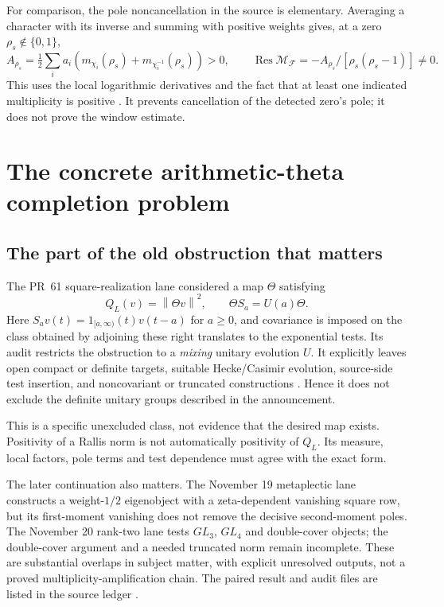 \documentclass[11pt,letterpaper]{article}
\theoremstyle{definition}
\theoremstyle{remark}
\newcommand{\Res}{\operatorname*{Res}}
\newcommand{\norm}[1]{\left\lVert#1\right\rVert}
\numberwithin{equation}{section}
\begin{document}
For comparison, the pole noncancellation in the source is elementary. Averaging a character with its inverse and summing with positive weights gives, at a zero $\rho_s\notin\{0,1\}$,
\[
 A_{\rho_s}=\tfrac12\sum_i a_i
 (m_{\chi_i}(\rho_s)+m_{\chi_i^{-1}}(\rho_s))>0,
 \qquad \Res\mathcal M_{\mathcal F}
 =-A_{\rho_s}/[\rho_s(\rho_s-1)]\ne0.
\]
This uses the local logarithmic derivatives and the fact that at least one indicated multiplicity is positive \cite{externalpoles}. It prevents cancellation of the detected zero's pole; it does not prove the window estimate.

\section{The concrete arithmetic-theta completion problem}

\subsection{The part of the old obstruction that matters}
The PR~61 square-realization lane considered a map $\Theta$ satisfying
\[
 Q_L(v)=\norm{\Theta v}^2,\qquad \Theta S_a=U(a)\Theta.
\]
Here $S_av(t)=1_{[a,\infty)}(t)v(t-a)$ for $a\ge0$, and covariance is imposed on the class obtained by adjoining these right translates to the exponential tests. Its audit restricts the obstruction to a \emph{mixing} unitary evolution $U$. It explicitly leaves open compact or definite targets, suitable Hecke/Casimir evolution, source-side test insertion, and noncovariant or truncated constructions \cite{rallisaudit}. Hence it does not exclude the definite unitary groups described in the announcement.

This is a specific unexcluded class, not evidence that the desired map exists. Positivity of a Rallis norm is not automatically positivity of $Q_L$. Its measure, local factors, pole terms and test dependence must agree with the exact form.

The later continuation also matters. The November 19 metaplectic lane constructs a weight-$1/2$ eigenobject with a zeta-dependent vanishing square row, but its first-moment vanishing does not remove the decisive second-moment poles. The November 20 rank-two lane tests $GL_3$, $GL_4$ and double-cover objects; the double-cover argument and a needed truncated norm remain incomplete. These are substantial overlaps in subject matter, with explicit unresolved outputs, not a proved multiplicity-amplification chain. The paired result and audit files are listed in the source ledger \cite{pr61}.
\end{document}
